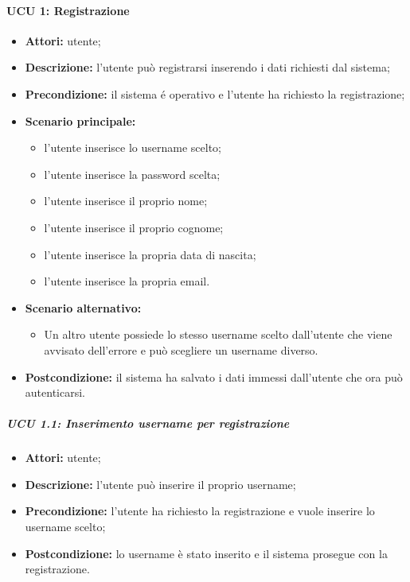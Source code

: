 \paragraph{UCU 1: Registrazione}
\begin{itemize}
	\item \textbf{Attori:} utente;
	\item \textbf{Descrizione:} l'utente può registrarsi inserendo i dati richiesti dal sistema;
	\item \textbf{Precondizione:} il sistema é operativo e l'utente ha richiesto la registrazione;
	\item \textbf{Scenario principale:}
	\begin{itemize}
		\item l'utente inserisce lo username scelto;
		\item l'utente inserisce la password scelta;
		\item l'utente inserisce il proprio nome;
		\item l'utente inserisce il proprio cognome;
		\item l'utente inserisce la propria data di nascita;
		\item l'utente inserisce la propria email.
	\end{itemize}
	\item \textbf{Scenario alternativo:}
	\begin{itemize}
		\item Un altro utente possiede lo stesso username scelto dall'utente che viene avvisato dell'errore e può scegliere un username diverso.
	\end{itemize}
	\item \textbf{Postcondizione:} il sistema ha salvato i dati immessi dall'utente che ora può autenticarsi.
\end{itemize}

\subparagraph{UCU 1.1: Inserimento username per registrazione}
\begin{itemize}
	\item \textbf{Attori:} utente;
	\item \textbf{Descrizione:} l'utente può inserire il proprio username;
	\item \textbf{Precondizione:} l'utente ha richiesto la registrazione e vuole inserire lo username scelto;
	\item \textbf{Postcondizione:} lo username è stato inserito e il sistema prosegue con la registrazione.
\end{itemize}

